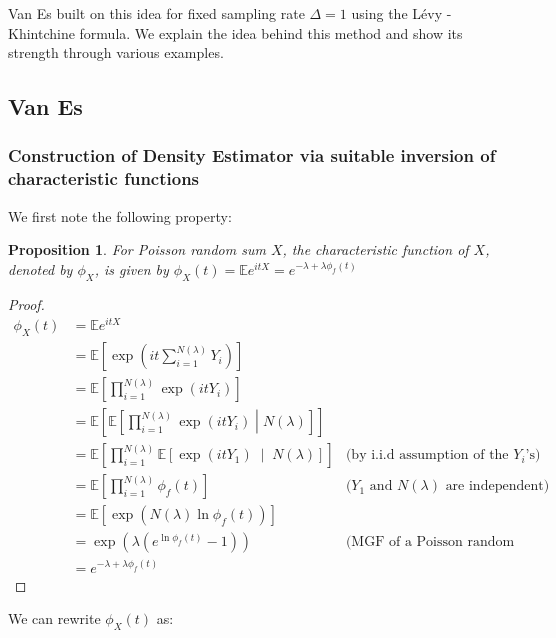 \documentclass[a4paper,11pt]{article}
\theoremstyle{theorem}
\newtheorem{prop}{Proposition}[section]
\theoremstyle{definition}
\providecommand{\E}{\mathbb{E}}
\begin{document}
Van Es built on this idea for fixed sampling rate $\Delta = 1$ using the L\'{e}vy - Khintchine formula. We explain the idea behind this method and show its strength through various examples.

\subsection{Van Es}

\subsubsection{Construction of Density Estimator via suitable inversion of characteristic functions}

We first note the following property:

\begin{prop}
For Poisson random sum $X$, the characteristic function of $X$, denoted by $\phi_{X}$, is given by $\phi_X(t) = \mathbb{E}e^{itX} = e^{-\lambda + \lambda \phi_{f}(t)}$ 
\end{prop}

\begin{proof}
\begin{align*}
\phi_{X}(t) &= \E e^{itX} \\
          &= \E \left[ \exp\left(it\sum_{i=1}^{N(\lambda)}{Y_{i}}\right)\right] \\
          &= \E \left[ \prod_{i=1}^{N(\lambda)}{\exp(itY_{i})} \right] \\
          &= \E \left[ \E \left[ \prod_{i=1}^{N(\lambda)}{\exp(itY_{i})} \middle| N(\lambda) \right] \right] \\
          &= \E \left[ \prod_{i=1}^{N(\lambda)}{\E \left[ \exp(itY_{1}) \;\middle|\; N(\lambda) \right]} \right] & \text{(by i.i.d assumption of the } Y_{i}\text{'s)}  \\
          &= \E \left[ \prod_{i=1}^{N(\lambda)}{\phi_{f}(t)} \right] & \text{(}Y_{1} \text{ and } N(\lambda) \text{ are independent)} \\
          &= \E \left[ \exp(N(\lambda) \ln\phi_{f}(t)) \right] \\
          &= \exp(\lambda(e^{\ln\phi_{f}(t)} - 1)) & \text{(MGF of a Poisson random variable)} \\
          &= e^{-\lambda + \lambda \phi_{f}(t)}
\end{align*}
\end{proof}

We can rewrite $\phi_{X}(t)$ as:
\end{document}
